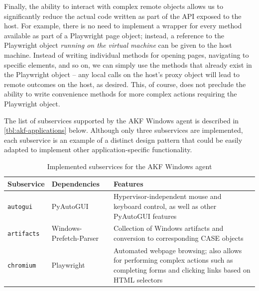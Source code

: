 \documentclass[letterpaper,12pt]{report}
\newcommand{\passthrough}[1]{#1}
\begin{document}
Finally, the ability to interact with complex remote objects allows us
to significantly reduce the actual code written as part of the API
exposed to the host. For example, there is no need to implement a
wrapper for every method available as part of a Playwright page object;
instead, a reference to the Playwright object \emph{running on the
virtual machine} can be given to the host machine. Instead of writing
individual methods for opening pages, navigating to specific elements,
and so on, we can simply use the methods that already exist in the
Playwright object -- any local calls on the host's proxy object will
lead to remote outcomes on the host, as desired. This, of course, does
not preclude the ability to write convenience methods for more complex
actions requiring the Playwright object.

The list of subservices supported by the AKF Windows agent is described
in \autoref{tbl:akf-applications} below. Although only three subservices
are implemented, each subservice is an example of a distinct design
pattern that could be easily adapted to implement other
application-specific functionality.


{
\small %
\begin{longtable}[]{@{}
  >{\raggedright\arraybackslash}p{}
  >{\raggedright\arraybackslash}p{}
  >{\raggedright\arraybackslash}p{}
@{}}
\caption{Implemented subservices for the AKF Windows agent}\label{tbl:akf-applications} \\
\toprule\noalign{}
\begin{minipage}[b]{\linewidth}\raggedright
Subservice
\end{minipage} & \begin{minipage}[b]{\linewidth}\raggedright
Dependencies
\end{minipage} & \begin{minipage}[b]{\linewidth}\raggedright
Features
\end{minipage} \\
\midrule\noalign{}
\endhead
\bottomrule\noalign{}
\endlastfoot
\passthrough{\lstinline!autogui!} & PyAutoGUI
\cite{sweigartAsweigartPyautogui2025a} & Hypervisor-independent
mouse and keyboard control, as well as other PyAutoGUI features \\
\passthrough{\lstinline!artifacts!} & Windows-Prefetch-Parser
\cite{wittPoorBillionaireWindowsPrefetchParser2025} & Collection of
Windows artifacts and conversion to corresponding CASE objects \\
\passthrough{\lstinline!chromium!} & Playwright
\cite{MicrosoftPlaywrightpython2025} & Automated webpage browsing;
also allows for performing complex actions such as completing forms and
clicking links based on HTML selectors \\
\end{longtable}
}
\end{document}
